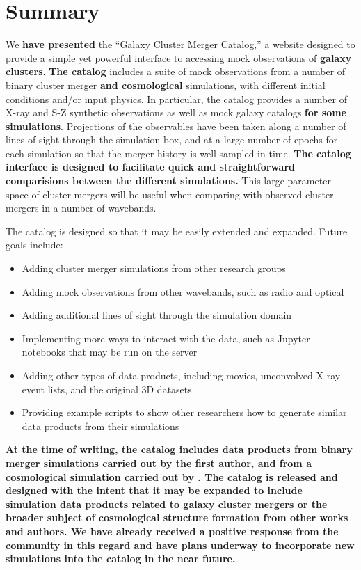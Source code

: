 \documentclass{emulateapj}
\begin{document}
\section{Summary}\label{sec:summary}

We {\bf have presented} the ``Galaxy Cluster Merger Catalog,'' a website designed to provide a simple yet powerful interface to accessing mock observations of {\bf galaxy clusters}. {\bf The catalog} includes a suite of mock observations from a number of binary cluster merger {\bf and cosmological} simulations, with different initial conditions and/or input physics. In particular, the catalog provides a number of X-ray and S-Z synthetic observations as well as mock galaxy catalogs {\bf for some simulations}. Projections of the observables have been taken along a number of lines of sight through the simulation box, and at a large number of epochs for each simulation so that the merger history is well-sampled in time. {\bf The catalog interface is designed to facilitate quick and straightforward comparisions between the different simulations.} This large parameter space of cluster mergers will be useful when comparing with observed cluster mergers in a number of wavebands.

The catalog is designed so that it may be easily extended and expanded. Future goals include:

\begin{itemize}
\item Adding cluster merger simulations from other research groups
\item Adding mock observations from other wavebands, such as radio and optical
\item Adding additional lines of sight through the simulation domain
\item Implementing more ways to interact with the data, such as Jupyter notebooks that may be run on the server
\item Adding other types of data products, including movies, unconvolved X-ray event lists, and the original 3D datasets
\item Providing example scripts to show other researchers how to generate similar data products from their simulations
\end{itemize}

\textbf{At the time of writing, the catalog includes data products from binary merger simulations carried out by the first author, and from a cosmological simulation carried out by \citet{nel14}. The catalog is released and designed with the intent that it may be expanded to include simulation data products related to galaxy cluster mergers or the broader subject of cosmological structure formation from other works and authors. We have already received a positive response from the community in this regard and have plans underway to incorporate new simulations into the catalog in the near future.}
\end{document}
